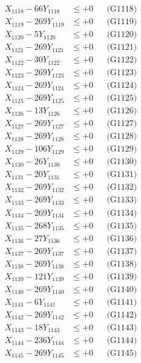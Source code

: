 \documentclass[a4paper,10pt]{article}
\begin{document}
{\begin{align}
X_{1118} - 66Y_{1118} &\leq +0 && \text{(G1118)} \\
X_{1119} - 269Y_{1119} &\leq +0 && \text{(G1119)} \\
X_{1120} - 5Y_{1120} &\leq +0 && \text{(G1120)} \\
\allowbreak
X_{1121} - 269Y_{1121} &\leq +0 && \text{(G1121)} \\
X_{1122} - 30Y_{1122} &\leq +0 && \text{(G1122)} \\
X_{1123} - 269Y_{1123} &\leq +0 && \text{(G1123)} \\
X_{1124} - 269Y_{1124} &\leq +0 && \text{(G1124)} \\
X_{1125} - 269Y_{1125} &\leq +0 && \text{(G1125)} \\
X_{1126} - 13Y_{1126} &\leq +0 && \text{(G1126)} \\
X_{1127} - 269Y_{1127} &\leq +0 && \text{(G1127)} \\
X_{1128} - 269Y_{1128} &\leq +0 && \text{(G1128)} \\
X_{1129} - 106Y_{1129} &\leq +0 && \text{(G1129)} \\
X_{1130} - 26Y_{1130} &\leq +0 && \text{(G1130)} \\
\allowbreak
X_{1131} - 20Y_{1131} &\leq +0 && \text{(G1131)} \\
X_{1132} - 269Y_{1132} &\leq +0 && \text{(G1132)} \\
X_{1133} - 269Y_{1133} &\leq +0 && \text{(G1133)} \\
X_{1134} - 269Y_{1134} &\leq +0 && \text{(G1134)} \\
X_{1135} - 268Y_{1135} &\leq +0 && \text{(G1135)} \\
X_{1136} - 27Y_{1136} &\leq +0 && \text{(G1136)} \\
X_{1137} - 269Y_{1137} &\leq +0 && \text{(G1137)} \\
X_{1138} - 269Y_{1138} &\leq +0 && \text{(G1138)} \\
X_{1139} - 121Y_{1139} &\leq +0 && \text{(G1139)} \\
X_{1140} - 269Y_{1140} &\leq +0 && \text{(G1140)} \\
\allowbreak
X_{1141} - 6Y_{1141} &\leq +0 && \text{(G1141)} \\
X_{1142} - 269Y_{1142} &\leq +0 && \text{(G1142)} \\
X_{1143} - 18Y_{1143} &\leq +0 && \text{(G1143)} \\
X_{1144} - 236Y_{1144} &\leq +0 && \text{(G1144)} \\
X_{1145} - 269Y_{1145} &\leq +0 && \text{(G1145)} \\

\end{align}}
\end{document}
